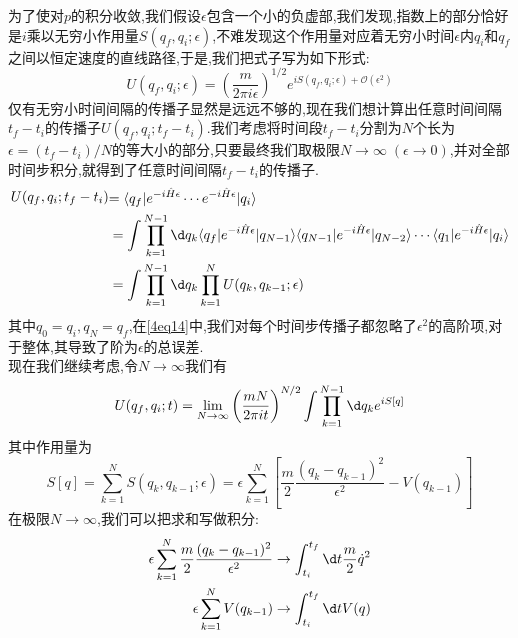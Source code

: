 为了使对$ p $的积分收敛,我们假设$\epsilon$包含一个小的负虚部,我们发现,指数上的部分恰好是$ i $乘以无穷小作用量$S(q_f,q_i;\epsilon)$,不难发现这个作用量对应着无穷小时间$\epsilon$内$ q_i $和$ q_f $之间以恒定速度的直线路径,于是,我们把式子写为如下形式:
\begin{equation}\label{4eq14}
	U(q_f,q_i;\epsilon)=\left(\frac{m}{2\pi i\epsilon}\right)^{1/2}e^{iS(q_f,q_i;\epsilon)+\mathcal{O}(\epsilon^2)}
\end{equation}
仅有无穷小时间间隔的传播子显然是远远不够的,现在我们想计算出任意时间间隔$t_f-t_i$的传播子$U(q_f,q_i;t_f-t_i)$.我们考虑将时间段$t_f-t_i$分割为$ N $个长为$\epsilon=(t_f-t_i)/N$的等大小的部分,只要最终我们取极限$N\to\infty\;(\epsilon\to0)$,并对全部时间步积分,就得到了任意时间间隔$t_f-t_i$的传播子.
\begin{equation}
	\begin{aligned}
		\begin{aligned}U(q_f,q_i;t_f-t_i)\end{aligned}& \begin{aligned}=\langle q_{f}|e^{-i\hat{H}\epsilon}\cdots e^{-i\hat{H}\epsilon}|q_{i}\rangle\end{aligned} \\
		&=\int\prod_{k=1}^{N-1}\d q_k\langle q_f|e^{-i\hat{H}\epsilon}|q_{N-1}\rangle\langle q_{N-1}|e^{-i\hat{H}\epsilon}|q_{N-2}\rangle\cdots\langle q_1|e^{-i\hat{H}\epsilon}|q_i\rangle \\
		&=\int\prod_{k=1}^{N-1}\d q_k\prod_{k=1}^NU(q_k,q_{k-1};\epsilon)
	\end{aligned}
\end{equation}
其中$q_0=q_i,q_N=q_f$,在\ref{4eq14}中,我们对每个时间步传播子都忽略了$\epsilon^2$的高阶项,对于整体,其导致了阶为$\epsilon$的总误差. \\
现在我们继续考虑,令$N\to\infty$我们有
\begin{equation}
	U(q_f,q_i;t)=\lim_{N\to\infty}\left(\frac{mN}{2\pi it}\right)^{N/2}\int\prod_{k=1}^{N-1}\d q_k e^{iS[q]}
\end{equation}
其中作用量为
\begin{equation}
	S[q]=\sum_{k=1}^NS(q_k,q_{k-1};\epsilon)=\epsilon\sum_{k=1}^N\left[\frac m2\frac{(q_k-q_{k-1})^2}{\epsilon^2}-V(q_{k-1})\right]
\end{equation}
在极限$N\to\infty$,我们可以把求和写做积分:
\begin{equation}
	\begin{aligned}\epsilon\sum_{k=1}^N\frac{m}{2}\frac{(q_k-q_{k-1})^2}{\epsilon^2}&\to\int_{t_i}^{t_f} \d t\frac{m}{2}\dot{q}^2\\\epsilon\sum_{k=1}^NV(q_{k-1})&\to\int_{t_i}^{t_f} \d t V(q)\end{aligned}
\end{equation}
